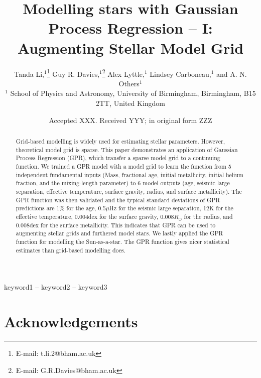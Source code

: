 \documentclass[fleqn,usenatbib]{mnras}
\title[Modelling stars with GP]{Modelling stars with Gaussian Process Regression -- I:  Augmenting Stellar Model Grid}
\author[T. Li et al.]{
Tanda Li,$^{1}$\thanks{E-mail: t.li.2@bham.ac.uk}
Guy R. Davies,$^{1}$\thanks{E-mail: G.R.Davies@bham.ac.uk}
Alex Lyttle,$^{1}$
Lindsey Carboneau,$^{1}$
and A. N. Others$^{1}$
\\
$^{1}$ School of Physics and Astronomy, University of Birmingham, Birmingham, B15 2TT, United Kingdom\\
}
\date{Accepted XXX. Received YYY; in original form ZZZ}
\begin{document}
\label{firstpage}
\pagerange{\pageref{firstpage}--\pageref{lastpage}}
\maketitle

\begin{abstract}
Grid-based modelling is widely used for estimating stellar parameters. However, theoretical model grid is sparse.  This paper demonstrates an application of Gaussian Process Regression (GPR), which transfer a sparse model grid to a continuing function. We trained a GPR model with a model grid to learn the function from 5 independent fundamental inputs (Mass, fractional age, initial metallicity, initial helium fraction, and the mixing-length parameter) to 6 model outputs (age, seismic large separation, effective temperature, surface gravity, radius, and surface metallicity). The GPR function was then validated and the typical standard deviations of GPR predictions are 1\% for the age, 0.5$\mu$Hz for the seismic large separation, 12K for the effective temperature, 0.004dex for the surface gravity, 0.008$R_{\odot}$ for the radius, and 0.008dex for the surface metallicity. This indicates that GPR can be used to augmenting stellar grids and furthered model stars. We lastly applied the GPR function for modelling the Sun-as-a-star. The GPR function gives nicer statistical estimates than grid-based modelling does. 
\end{abstract}

\begin{keywords}
keyword1 -- keyword2 -- keyword3
\end{keywords}


%









%





\section*{Acknowledgements}
\end{document}
